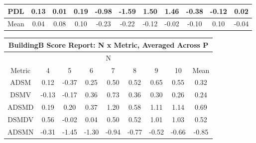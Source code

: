 \documentclass[11pt,a4paper]{report}
\begin{document}
\begin{longtable}{ | c || c | c | c | c | c | c | c | c | c || c |}
PDL &  \cellcolor[HTML]{FFFFFF} 0.13 &  \cellcolor[HTML]{FFFFFF} 0.01 &  \cellcolor[HTML]{F7F7FF} 0.19 &  \cellcolor[HTML]{FFE7E7} -0.98 &  \cellcolor[HTML]{FFD7D7} -1.59 &  \cellcolor[HTML]{D7D7FF} 1.50 &  \cellcolor[HTML]{D7D7FF} 1.46 &  \cellcolor[HTML]{FFF7F7} -0.38 &  \cellcolor[HTML]{FFFFFF} -0.12 &  \cellcolor[HTML]{FFFFFF} 0.02 \\
\hline
\hline
Mean  &  \cellcolor[HTML]{FFFFFF} 0.04 &  \cellcolor[HTML]{FFFFFF} 0.08 &  \cellcolor[HTML]{FFFFFF} 0.10 &  \cellcolor[HTML]{FFF7F7} -0.23 &  \cellcolor[HTML]{FFF7F7} -0.22 &  \cellcolor[HTML]{FFFFFF} -0.12 &  \cellcolor[HTML]{FFFFFF} -0.02 &  \cellcolor[HTML]{FFFFFF} -0.10 &  \cellcolor[HTML]{FFFFFF} 0.10 &  \cellcolor[HTML]{FFFFFF} -0.04 \\
\hline
\end{longtable}
\begin{longtable}{ | c || c | c | c | c | c | c | c || c |}
\hline
\multicolumn{9}{|c|}{ BuildingB Score Report: N x Metric, Averaged Across P } \\
\hline
\multicolumn{9}{|c|}{ N } \\
\hline
Metric & 4 & 5 & 6 & 7 & 8 & 9 & 10 & Mean\\
\hline
\hline
\endhead
ADSM &  \cellcolor[HTML]{FFFFFF} 0.12 &  \cellcolor[HTML]{FFF7F7} -0.37 &  \cellcolor[HTML]{F7F7FF} 0.25 &  \cellcolor[HTML]{EFEFFF} 0.50 &  \cellcolor[HTML]{EFEFFF} 0.52 &  \cellcolor[HTML]{EFEFFF} 0.65 &  \cellcolor[HTML]{EFEFFF} 0.55 &  \cellcolor[HTML]{F7F7FF} 0.32 \\
DSMV &  \cellcolor[HTML]{FFFFFF} -0.13 &  \cellcolor[HTML]{FFF7F7} -0.17 &  \cellcolor[HTML]{F7F7FF} 0.36 &  \cellcolor[HTML]{EFEFFF} 0.73 &  \cellcolor[HTML]{F7F7FF} 0.36 &  \cellcolor[HTML]{F7F7FF} 0.30 &  \cellcolor[HTML]{F7F7FF} 0.26 &  \cellcolor[HTML]{F7F7FF} 0.24 \\
ADSMD &  \cellcolor[HTML]{F7F7FF} 0.19 &  \cellcolor[HTML]{F7F7FF} 0.20 &  \cellcolor[HTML]{F7F7FF} 0.37 &  \cellcolor[HTML]{DFDFFF} 1.20 &  \cellcolor[HTML]{EFEFFF} 0.58 &  \cellcolor[HTML]{E7E7FF} 1.11 &  \cellcolor[HTML]{DFDFFF} 1.14 &  \cellcolor[HTML]{EFEFFF} 0.69 \\
DSMDV &  \cellcolor[HTML]{EFEFFF} 0.56 &  \cellcolor[HTML]{FFFFFF} -0.02 &  \cellcolor[HTML]{FFFFFF} 0.04 &  \cellcolor[HTML]{EFEFFF} 0.50 &  \cellcolor[HTML]{EFEFFF} 0.52 &  \cellcolor[HTML]{E7E7FF} 1.01 &  \cellcolor[HTML]{E7E7FF} 1.03 &  \cellcolor[HTML]{EFEFFF} 0.52 \\
ADSMN &  \cellcolor[HTML]{FFF7F7} -0.31 &  \cellcolor[HTML]{FFD7D7} -1.45 &  \cellcolor[HTML]{FFDFDF} -1.30 &  \cellcolor[HTML]{FFE7E7} -0.94 &  \cellcolor[HTML]{FFEFEF} -0.77 &  \cellcolor[HTML]{FFEFEF} -0.52 &  \cellcolor[HTML]{FFEFEF} -0.66 &  \cellcolor[HTML]{FFE7E7} -0.85 \\

\end{longtable}
\end{document}
